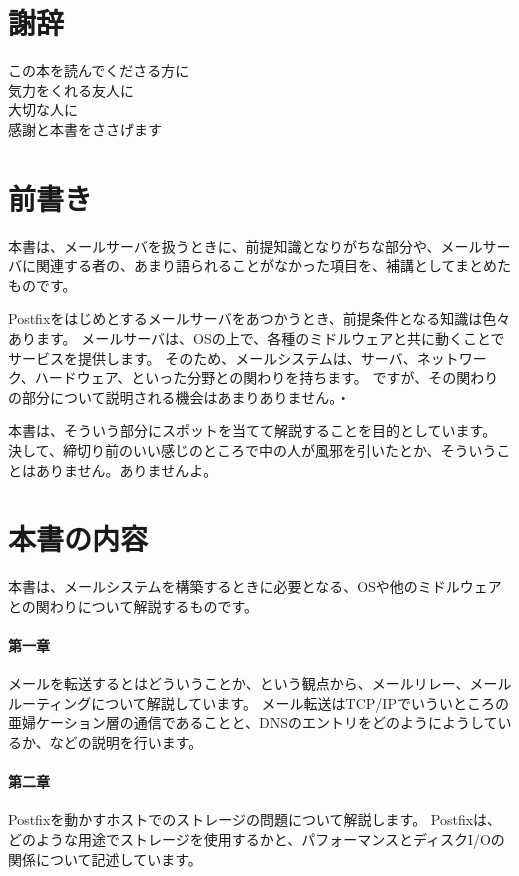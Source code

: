 \section*{謝辞}
\begin{center}
この本を読んでくださる方に \\
気力をくれる友人に \\
大切な人に \\
感謝と本書をささげます
\end{center}

\section*{前書き}

本書は、メールサーバを扱うときに、前提知識となりがちな部分や、メールサーバに関連する者の、あまり語られることがなかった項目を、補講としてまとめたものです。

Postfixをはじめとするメールサーバをあつかうとき、前提条件となる知識は色々あります。
メールサーバは、OSの上で、各種のミドルウェアと共に動くことでサービスを提供します。
そのため、メールシステムは、サーバ、ネットワーク、ハードウェア、といった分野との関わりを持ちます。
ですが、その関わりの部分について説明される機会はあまりありません。・

本書は、そういう部分にスポットを当てて解説することを目的としています。
決して、締切り前のいい感じのところで中の人が風邪を引いたとか、そういうことはありません。ありませんよ。


\section*{本書の内容}
本書は、メールシステムを構築するときに必要となる、OSや他のミドルウェアとの関わりについて解説するものです。

\paragraph{第一章}
メールを転送するとはどういうことか、という観点から、メールリレー、メールルーティングについて解説しています。
メール転送はTCP/IPでいういところの亜婦ケーション層の通信であることと、DNSのエントリをどのようにようしているか、などの説明を行います。

\paragraph{第二章}
Postfixを動かすホストでのストレージの問題について解説します。
Postfixは、どのような用途でストレージを使用するかと、パフォーマンスとディスクI/Oの関係について記述しています。

